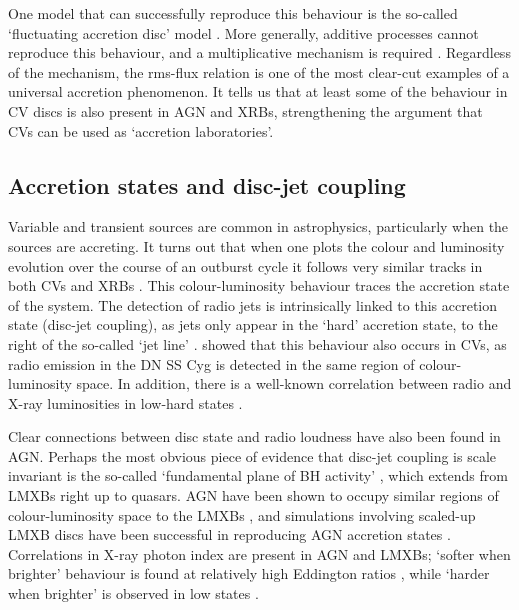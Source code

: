 One model that can successfully reproduce this behaviour is the so-called
`fluctuating accretion disc' model \citep{lyubarskii1997,kotov2001,
arevalo2006,hogg2015}. More generally,
additive processes cannot reproduce this behaviour, and a multiplicative
mechanism is required \citep{uttley2005}. 
Regardless of the mechanism, the rms-flux relation is one of the most
clear-cut examples of a universal accretion phenomenon. 
It tells us that at least some of the behaviour in CV discs
is also present in AGN and XRBs, strengthening the argument that CVs
can be used as `accretion laboratories'. 


\subsection{Accretion states and disc-jet coupling}
\label{sec:disc-jet}

Variable and transient sources are common in astrophysics, particularly
when the sources are accreting. It turns out that when one plots
the colour and luminosity evolution over the course of an outburst cycle 
it follows very similar tracks in both CVs and XRBs
\citep[see Fig.~\ref{fig:kording_hid}, ][]{kordingDNjet2008}.
This colour-luminosity behaviour traces the accretion state of the system. 
The detection of radio jets is intrinsically linked to this accretion state
(disc-jet coupling), as jets only appear in the `hard' accretion 
state, to the right of the so-called `jet line' \citep{fender2001,fender2004}.
\cite{kordingDNjet2008} showed that this behaviour also occurs in CVs, 
as radio emission in the DN SS Cyg is detected in the same region 
of colour-luminosity space. In addition, there is a well-known correlation between 
radio and X-ray luminosities in low-hard states \citep{gallo2003}.

Clear connections between disc state and radio loudness have also been
found in AGN. Perhaps the most obvious piece of evidence that disc-jet coupling
is scale invariant is the so-called `fundamental plane of BH activity' 
\citep{merloni2003}, which extends from LMXBs right up to quasars. 
AGN have been shown to occupy similar regions of colour-luminosity
space to the LMXBs \citep{kording2006}, and simulations involving
scaled-up LMXB discs have been successful in reproducing AGN accretion states
\citep{sobolewska2011}. Correlations
in X-ray photon index are present in AGN and LMXBs;
`softer when brighter' behaviour is found 
at relatively high Eddington ratios \citep{mchardy1999,gu2009},
while `harder when brighter' is observed in 
low states \citep{gu2009,dimitri_llagn,connolly2016}.

